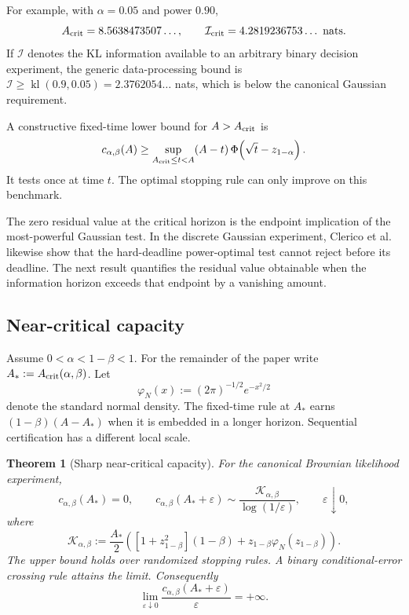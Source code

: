 \documentclass[11pt]{article}
\numberwithin{equation}{section}
\theoremstyle{plain}
\newtheorem{theorem}{Theorem}[section]
\theoremstyle{definition}
\theoremstyle{remark}
\begin{document}
For example, with \(\alpha=0.05\) and power \(0.90\), \[
A_{\rm crit}=8.5638473507\ldots,
\qquad
\mathcal I_{\rm crit}=4.2819236753\ldots\ \text{nats}.
\] If $\mathcal I$ denotes the KL information available to an arbitrary binary decision experiment, the generic data-processing bound is
$\mathcal I\ge\operatorname{kl}(0.9,0.05)=2.3762054\ldots$ nats, which is below the canonical Gaussian requirement.

A constructive fixed-time lower bound for
\(A>A_{\rm crit}\) is \[
c_{\alpha,\beta}(A)
\ge
\sup_{A_{\rm crit}\le t<A}
(A-t)\,\Phi\!\left(\sqrt t-z_{1-\alpha}\right).
\] It tests once at time \(t\). The optimal stopping rule can only
improve on this benchmark.

The zero residual value at the critical horizon is the endpoint implication of the most-powerful Gaussian test. In the discrete Gaussian experiment, Clerico et al.~\cite[Sections 6 and 8]{clericoetal2026} likewise show that the hard-deadline power-optimal test cannot reject before its deadline. The next result quantifies the residual value obtainable when the information horizon exceeds that endpoint by a vanishing amount.

\subsection{Near-critical capacity}\label{near-critical-capacity}

Assume $0<\alpha<1-\beta<1$. For the remainder of the paper write $A_*:=A_{\rm crit}(\alpha,\beta)$. Let
\[
\varphi_N(x):=(2\pi)^{-1/2}e^{-x^2/2}
\]
denote the standard normal density.  The fixed-time rule at $A_*$ earns $(1-\beta)(A-A_*)$ when it is embedded in a longer horizon.  Sequential certification has a different local scale.

\begin{theorem}[Sharp near-critical capacity]\label{thm:near-critical-capacity}
For the canonical Brownian likelihood experiment,
\[
c_{\alpha,\beta}(A_*)=0,
\qquad
c_{\alpha,\beta}(A_*+\varepsilon)
\sim
\frac{\mathcal K_{\alpha,\beta}}{\log(1/\varepsilon)},
\qquad \varepsilon\downarrow0,
\]
where
\begin{equation}\label{eq:sharp-capacity-constant}
\mathcal K_{\alpha,\beta}
:=
\frac{A_*}{2}
\left(
[1+z_{1-\beta}^2](1-\beta)
+z_{1-\beta}\varphi_N(z_{1-\beta})
\right).
\end{equation}
The upper bound holds over randomized stopping rules.  A binary conditional-error crossing rule attains the limit.  Consequently
\[
\lim_{\varepsilon\downarrow0}
\frac{c_{\alpha,\beta}(A_*+\varepsilon)}{\varepsilon}=+\infty.
\]
\end{theorem}
\end{document}
